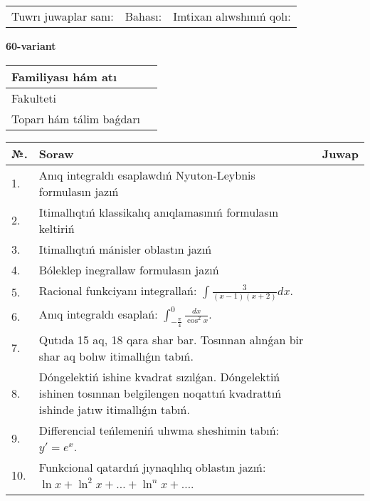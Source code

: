 \documentclass{article}
\begin{document}
\vspace{1cm}

\begin{tabular}{ c c c }
Tuwrı juwaplar sanı: \underline{\hspace{2cm}} & Bahası: \underline{\hspace{2cm}} & Imtixan alıwshınıń qolı: \underline{\hspace{2cm}} \\
\end{tabular}

\newpage

\begin{center}\textbf{60-variant}\end{center}

\bgroup
\def\arraystretch{1.5}
\begin{tabular}{ |m{6cm}|m{10cm}| }
  \hline
  Familiyası hám atı & \\
  \hline
  Fakulteti &\\
  \hline
  Toparı hám tálim baǵdarı & \\
  \hline
\end{tabular}
\egroup

\vspace{0.5cm}

\bgroup
\def\arraystretch{2}
\begin{tabular}{ |l|m{8cm}|m{7cm}| }
  \hline
  №. & Soraw & Juwap \\
  \hline
  1. & Anıq integraldı esaplawdıń Nyuton-Leybnis formulasın jazıń &  \\
  \hline
  2. & Itimallıqtıń klassikalıq anıqlamasınıń formulasın keltiriń &  \\
  \hline
  3. & Itimallıqtıń mánisler oblastın jazıń &  \\
  \hline
  4. & Bóleklep inegrallaw formulasın jazıń &  \\
  \hline
  5. & Racional funkciyanı integrallań: $\displaystyle\int {\frac{3}{(x - 1)(x + 2)}dx}$. &  \\
  \hline
  6. & Anıq integraldı esaplań: $\displaystyle\int_{-\frac{\pi}{4}}^{0}\frac{dx}{\cos^{2}x}$. &  \\
  \hline
  7. & Qutıda 15 aq, 18 qara shar bar. Tosınnan alınǵan bir shar aq bolıw itimallıǵın tabıń. &  \\
  \hline
  8. & Dóngelektiń ishine kvadrat sızılǵan. Dóngelektiń ishinen tosınnan belgilengen noqattıń kvadrattıń ishinde jatıw itimallıǵın tabıń. &  \\
  \hline
  9. & Differencial teńlemeniń ulıwma sheshimin tabıń: $y'=e^{x}$. &  \\
  \hline
  10. & Funkcional qatardıń jıynaqlılıq oblastın jazıń: $\ln x + \ln^{2}x + \ldots + \ln^{n}x + \ldots$. &  \\
  \hline
\end{tabular}
\egroup
\end{document}
